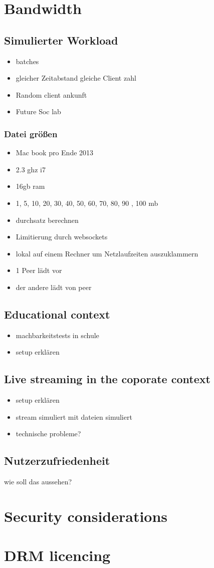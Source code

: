 \section{Bandwidth}

\subsection{Simulierter Workload}
\begin{itemize}
	\item batches
	\item gleicher Zeitabstand gleiche Client zahl
	\item Random client ankunft
	\item Future Soc lab
\end{itemize}

\subsubsection{Datei größen}
\begin{itemize}
	\item Mac book pro Ende 2013
	\item 2.3 ghz i7
	\item 16gb ram
	\item 1, 5, 10, 20, 30, 40, 50, 60, 70, 80, 90 , 100 mb
	\item durchsatz berechnen
	\item Limitierung durch websockets
	\item lokal auf einem Rechner um Netzlaufzeiten auszuklammern
	\item 1 Peer lädt vor
	\item der andere lädt von peer
\end{itemize}
\subsection{Educational context}
\begin{itemize}
	\item machbarkeitstests in schule
	\item setup erklären
	
\end{itemize}

\subsection{Live streaming in the coporate context}
\begin{itemize}
	\item setup erklären
	\item stream simuliert mit dateien simuliert
	\item technische probleme?
\end{itemize}

\subsection{Nutzerzufriedenheit}
wie soll das aussehen?

\section{Security considerations}
\section{DRM licencing}
